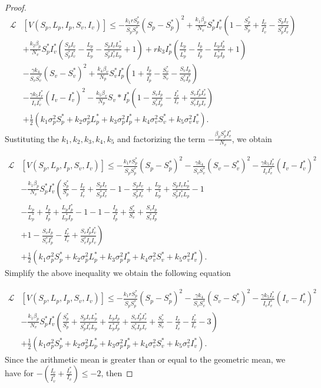 \begin{proof}
	\begin{align*}
		\mathcal{L}&[V(S_p,L_p,I_p,S_v,I_v)]\leq 
			-\frac{k_1rS_p^*}{S_pS_p^*}(S_p-S_p^*)^2+\frac{k_1\beta_p}{N_v}S_p^*I_v^*(1-\frac{S_p^*}{S_p}+\frac{I_v}{I_v^*}-\frac{S_pI_v}{S_p^*I_v^*})\\
		&+
			\frac{k_2\beta_p}{N_v}S_p^*I_v^*(\frac{S_pI_v}{S^*_pI^*_v}-\frac{L_p}{L_p^*}-\frac{S_pI_vL_p^*}{S_p^*I_v^*L_p}+1)+rk_3I_p^*(\frac{L_p}{L_p^*}-\frac{I_p}{I^*_p}-\frac{L_pI_p^*}{L_p^*I_p}+1)\\
		&-
			\frac{\gamma k_4}{S_vS_v^*}(S_v-S_v^*)^2+\frac{k_4\beta_v}{N_p}S_v^*I_p^*(1+\frac{I_p}{I_p^*}-\frac{S_v^*}{S_v}-\frac{S_vI_p}{S_v^*I_p^*})\\
		&-
			\frac{\gamma k_5 I_v^*}{I_vI_v^*}(I_v-I_v^*)^2-\frac{k_5\beta_v}{N_p}S_v*I_p^*(1-\frac{S_vI_p}{S_v^*I_p^*}-\frac{I_v^*}{I_v}+\frac{S_vI_p^*I_v^*}{S_v^*I_pI_v})\\
		&+
			\frac{1}{2}\left(k_1\sigma_p^2S_p^*+k_2\sigma_p^2 L_p^*+k_3\sigma_p^2I_p^*+k_4\sigma_v^2S_v^*+k_5\sigma_v^2I_v^*\right).
	\end{align*}
%
	Sustituting the $k_1,k_2,k_3,k_4, k_5$ and factorizing the term $-\frac{\beta_p S_p^*I_v^*}{N_v}$, we obtain
	
	\begin{align*}
		\mathcal{L}&[V(S_p,L_p,I_p,S_v,I_v)]\leq 
				-\frac{k_1rS_p^*}{S_pS_p^*}(S_p-S_p^*)^2-\frac{\gamma k_4}{S_vS_v^*}(S_v-S_v^*)^2-\frac{\gamma k_5 I_v^*}{I_vI_v^*}(I_v-I_v^*)^2\\
			&-
				\frac{k_1\beta_p}{N_v}S_p^*I_v^*\left(\frac{S_p^*}{S_p}-\frac{I_v}{I_v^*}+\frac{S_pI_v}{S_p^*I_v^*}-1-\frac{S_pI_v}{S^*_pI^*_v}+\frac{L_p}{L_p^*}+\frac{S_pI_vL_p^*}{S_p^*I_v^*L_p}-1\right.\\
			&-
				\frac{L_p}{L_p^*}+\frac{I_p}{I^*_p}+\frac{L_pI_p^*}{L_p^*I_p}-1-1-\frac{I_p}{I_p^*}+\frac{S_v^*}{S_v}+\frac{S_vI_p}{S_v^*I_p^*}\\
			&+
				\left.1-\frac{S_vI_p}{S_v^*I_p^*}-\frac{I_v^*}{I_v}+\frac{S_vI_p^*I_v^*}{S_v^*I_pI_v}\right)\\
			&+
				\frac{1}{2}\left(k_1\sigma_p^2S_p^*+k_2\sigma_p^2 L_p^*+k_3\sigma_p^2I_p^*+k_4\sigma_v^2S_v^*+k_5\sigma_v^2I_v^*\right).
	\end{align*}
%	
	Simplify the above inequality we obtain the following equation
	
		\begin{align*}
		\mathcal{L}&[V(S_p,L_p,I_p,S_v,I_v)]\leq 
				-\frac{k_1rS_p^*}{S_pS_p^*}(S_p-S_p^*)^2-\frac{\gamma k_4}{S_vS_v^*}(S_v-S_v^*)^2-\frac{\gamma k_5 I_v^*}{I_vI_v^*}(I_v-I_v^*)^2\\
			&-
				\frac{k_1\beta_p}{N_v}S_p^*I_v^*\left(\frac{S_p^*}{S_p}+\frac{S_pI_vL_p^*}{S_p^*I_v^*L_p}+\frac{L_pI_p}{L_p^*I_p^*}+\frac{S_vI_p^*I_v^*}{S_v^*I_pI_v}+\frac{S_v^*}{S_v}-\frac{I_v}{I_v^*}-\frac{I_v^*}{I_v}-3\right)\\
			&+
				\frac{1}{2}\left(k_1\sigma_p^2S_p^*+k_2\sigma_p^2 L_p^*+k_3\sigma_p^2I_p^*+k_4\sigma_v^2S_v^*+k_5\sigma_v^2I_v^*\right).
	\end{align*}
%	
	Since the arithmetic mean is greater than or equal to the geometric mean, we have for 	$-\left(\frac{I_v}{I_v^*}+\frac{I_v^*}{I_v}\right)\leq -2$, then
	

\end{proof}
